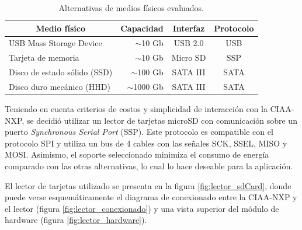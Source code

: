 \vspace{10px}

\begin{table}[ht]
\centering
\caption{Alternativas de medios físicos evaluados.}
\label{tab:medios}
\begin{tabular}{lrcc}
\toprule
\multicolumn{1}{c}{\textbf{Medio físico}} & \multicolumn{1}{c}{\textbf{Capacidad}} & \textbf{Interfaz} & \textbf{Protocolo} \\ \midrule
USB Mass Storage Device                   & $\sim$10 Gb                            & USB 2.0           & USB                \\
Tarjeta de memoria                        & $\sim$10 Gb                            & Micro SD          & SSP                \\
Disco de estado sólido (SSD)              & $\sim$100 Gb                           & SATA III          & SATA               \\
Disco duro mecánico (HHD)                 & $\sim$1000 Gb                          & SATA III          & SATA               \\ \bottomrule
\end{tabular}
\end{table}

\vspace{10px}

Teniendo en cuenta criterios de costos y simplicidad de interacción con la CIAA-NXP, se decidió utilizar un lector de tarjetas microSD con comunicación sobre un puerto \textit{Synchronous Serial Port} (SSP).  Este protocolo es compatible con el protocolo SPI y utiliza un bus de 4 cables con las señales SCK, SSEL, MISO y MOSI.  Asimismo, el soporte seleccionado minimiza el consumo de energía comparado con las otras alternativas, lo cual lo hace deseable para la aplicación.  

El lector de tarjetas utilizado se presenta en la figura \ref{fig:lector_sdCard}, donde puede verse esquemáticamente el diagrama de conexionado entre la CIAA-NXP y el lector (figura \ref{fig:lector_conexionado}) y una vista superior del módulo de hardware (figura \ref{fig:lector_hardware}).

\vspace{20px}

